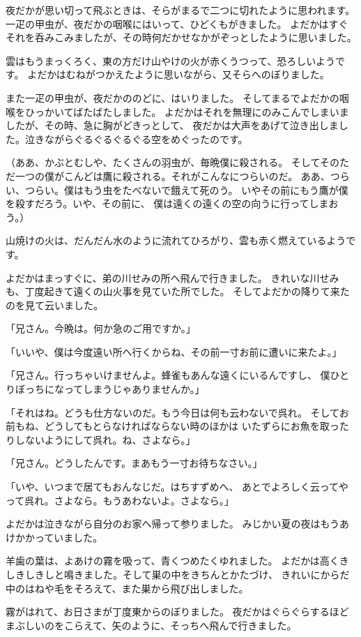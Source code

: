 \documentclass[a4paper, platex, dvipdfmx]{jsarticle}
\begin{document}
夜だかが思い切って飛ぶときは、そらがまるで二つに切れたように思われます。
一疋の甲虫が、夜だかの咽喉にはいって、ひどくもがきました。
よだかはすぐそれを呑みこみましたが、その時何だかせなかがぞっとしたように思いました。

雲はもうまっくろく、東の方だけ山やけの火が赤くうつって、恐ろしいようです。
よだかはむねがつかえたように思いながら、又そらへのぼりました。

また一疋の甲虫が、夜だかののどに、はいりました。
そしてまるでよだかの咽喉をひっかいてばたばたしました。
よだかはそれを無理にのみこんでしまいましたが、その時、急に胸がどきっとして、
夜だかは大声をあげて泣き出しました。泣きながらぐるぐるぐるぐる空をめぐったのです。

（ああ、かぶとむしや、たくさんの羽虫が、毎晩僕に殺される。
そしてそのただ一つの僕がこんどは鷹に殺される。それがこんなにつらいのだ。
ああ、つらい、つらい。僕はもう虫をたべないで餓えて死のう。
いやその前にもう鷹が僕を殺すだろう。いや、その前に、
僕は遠くの遠くの空の向うに行ってしまおう。）

山焼けの火は、だんだん水のように流れてひろがり、雲も赤く燃えているようです。

よだかはまっすぐに、弟の川せみの所へ飛んで行きました。
きれいな川せみも、丁度起きて遠くの山火事を見ていた所でした。
そしてよだかの降りて来たのを見て云いました。

「兄さん。今晩は。何か急のご用ですか。」

「いいや、僕は今度遠い所へ行くからね、その前一寸お前に遭いに来たよ。」

「兄さん。行っちゃいけませんよ。蜂雀もあんな遠くにいるんですし、
僕ひとりぼっちになってしまうじゃありませんか。」

「それはね。どうも仕方ないのだ。もう今日は何も云わないで呉れ。
そしてお前もね、どうしてもとらなければならない時のほかは
いたずらにお魚を取ったりしないようにして呉れ。ね、さよなら。」

「兄さん。どうしたんです。まあもう一寸お待ちなさい。」

「いや、いつまで居てもおんなじだ。はちすずめへ、
あとでよろしく云ってやって呉れ。さよなら。もうあわないよ。さよなら。」

よだかは泣きながら自分のお家へ帰って参りました。
みじかい夏の夜はもうあけかかっていました。

羊歯の葉は、よあけの霧を吸って、青くつめたくゆれました。
よだかは高くきしきしきしと鳴きました。そして巣の中をきちんとかたづけ、
きれいにからだ中のはねや毛をそろえて、また巣から飛び出しました。

霧がはれて、お日さまが丁度東からのぼりました。
夜だかはぐらぐらするほどまぶしいのをこらえて、矢のように、そっちへ飛んで行きました。
\end{document}
